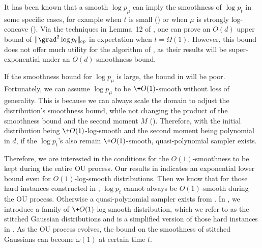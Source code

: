 It has been known that a smooth $\log p_{\mu}$ can imply the smoothness of $\log p_t$ in some specific cases, for example when $t$ is small (\cite{CLL23}) or when $\mu$ is strongly log-concave (\cite{LPSR21}). Via the techniques in Lemma~12 of \cite{CLL23}, one can prove an $O(d)$ upper bound of $\|\grad^2 \log p_t\|_{\!{op}}$ in expectation when $t=\Omega(1)$. However, this bound does not offer much utility for the algorithm of \cite{HZD+24}, as their results will be super-exponential under an $O(d)$-smoothness bound.

If the smoothness bound for $\log p_{\mu}$ is large, the bound in \cite{HZD+24} will be poor. Fortunately, we can assume $\log p_{\mu}$ to be $\+O(1)$-smooth without loss of generality. This is because we can always scale the domain to adjust the distribution's smoothness bound, while not changing the product of the smoothness bound and the second moment $M$ (). Therefore, with the initial distribution being $\+O(1)$-log-smooth and the second moment being polynomial in $d$, if the $\log p_t$'s also remain $\+O(1)$-smooth, quasi-polynomial sampler exists. 


Therefore, we are interested in the conditions for the $O(1)$-smoothness to be kept during the entire OU process. Our results in  indicates an exponential lower bound even for $O(1)$-log-smooth distributions. Then we know that for those hard instances constructed in , $\log p_t$ cannot always be $O(1)$-smooth during the OU process. Otherwise a quasi-polynomial sampler exists from \cite{HZD+24}. 
In , we introduce a family of $\+O(1)$-log-smooth distribution, which we refer to as the stitched Gaussian distributions and is a simplified version of those hard instances in . As the OU process evolves, the bound on the smoothness of stitched Gaussians can become $\omega(1)$ at certain time $t$. 

